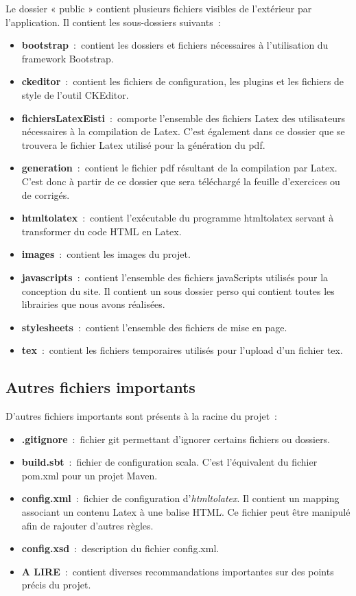 Le dossier « public » contient plusieurs fichiers visibles de l'extérieur par l'application. Il contient les sous-dossiers suivants~:
\medskip
\begin{itemize}
\item \textbf{bootstrap}~:~contient les dossiers et fichiers nécessaires à l'utilisation du framework Bootstrap.
\item \textbf{ckeditor}~:~contient les fichiers de configuration, les plugins et les fichiers de style de l'outil CKEditor.
\item \textbf{fichiersLatexEisti}~:~comporte l'ensemble des fichiers Latex des utilisateurs nécessaires à la compilation de Latex. C'est également dans ce dossier que se trouvera le fichier Latex utilisé pour la génération du pdf.
\item \textbf{generation}~:~contient le fichier pdf résultant de la compilation par Latex. C'est donc à partir de ce dossier que sera téléchargé la feuille d'exercices ou de corrigés.
\item \textbf{htmltolatex}~:~contient l'exécutable du programme htmltolatex servant à transformer du code HTML en Latex.
\item \textbf{images}~:~contient les images du projet.
\item \textbf{javascripts}~:~contient l'ensemble des fichiers javaScripts utilisés pour la conception du site. Il contient un sous dossier perso qui contient toutes les librairies que nous avons réalisées.
\item \textbf{stylesheets}~:~contient l'ensemble des fichiers de mise en page. 
\item \textbf{tex}~:~contient les fichiers temporaires utilisés pour l'upload d'un fichier tex.
\end{itemize}

\subsection{Autres fichiers importants}     

D'autres fichiers importants sont présents à la racine du projet~:
\medskip
\begin{itemize}
\item \textbf{.gitignore}~:~fichier git permettant d'ignorer certains fichiers ou dossiers. 
\item \textbf{build.sbt}~:~fichier de configuration scala. C'est l'équivalent du fichier pom.xml pour un projet Maven.
\item \textbf{config.xml}~:~fichier de configuration d'\emph{htmltolatex}. Il contient un mapping associant un contenu Latex à une balise HTML. Ce fichier peut être manipulé afin de rajouter d'autres règles.
\item \textbf{config.xsd}~:~description du fichier config.xml.
\item \textbf{A LIRE}~:~contient diverses recommandations importantes sur des points précis du projet.
\end{itemize}

